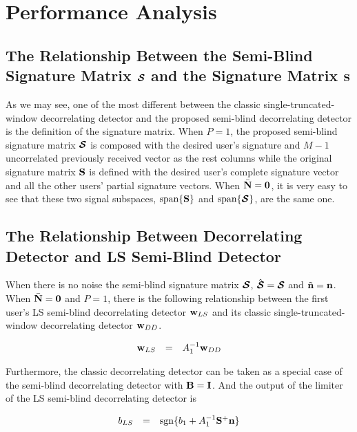 \documentclass[a4paper,10pt,fleqn, twocolumn]{IEEETran}
\newcommand{\bn}{{\bf n}}
\newcommand{\bw}{{\bf w}}
\newcommand{\bN}{{\bf N}}
\newcommand{\bS}{{\bf S}}
\newcommand{\bI}{{\bf I}}
\newcommand{\bB}{{\bf B}}
\newcommand{\bcS}{{\mbox {\boldmath ${\cal S}$}}}
\begin{document}
\section{Performance Analysis}

\subsection{The Relationship Between the Semi-Blind Signature Matrix $\bcS$ and the Signature Matrix $\bS$}

As we may see, one of the most different between the classic
single-truncated-window decorrelating detector and the proposed
semi-blind decorrelating detector is the definition of the
signature matrix. When $P=1$, the proposed semi-blind signature
matrix $\bcS$ is composed with the desired user's signature and
$M-1$ uncorrelated previously received vector as the rest columns
while the original signature matrix $\bS$ is defined with the
desired user's complete signature vector and all the other users'
partial signature vectors. When $\bar{\bN} = \mathbf{0}$, it is
very easy to see that these two signal subspaces,
$\mbox{span}\{\bS\}$ and $\mbox{span}\{\bcS\}$, are the same one.

\subsection{The Relationship Between Decorrelating Detector and LS Semi-Blind Detector }

When there is no noise the semi-blind signature matrix $\bcS$,
$\hat{\bcS}=\bcS$ and $\tilde{\bn}=\bn$. When
$\bar{\bN}=\mathbf{0}$ and $P=1$, there is the following
relationship between the first user's LS semi-blind decorrelating
detector $\bw_{LS}$ and its classic single-truncated-window
decorrelating detector $\bw_{DD}$.

\begin{equation}
\begin{array}{rcl}
\bw_{LS}&=&A_1^{-1}\bw_{DD}
\end{array}
\end{equation} \label{wN0}

\noindent Furthermore, the classic decorrelating detector can be
taken as a special case of the semi-blind decorrelating detector
with $\bB =\bI$. And the output of the limiter of the LS
semi-blind decorrelating detector is

\begin{equation}
\begin{array}{rcl}
b_{LS}&=&\mbox{sgn}\{b_1+A_1^{-1}\bS^+\bn\}
\end{array} \label{b_LS_N0}
\end{equation}
\end{document}
